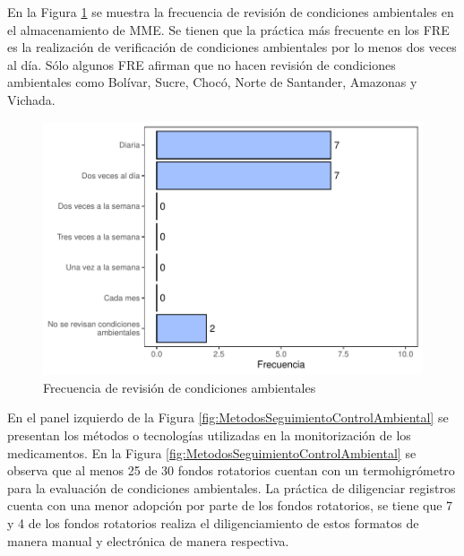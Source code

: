 \documentclass[
]{book}
\begin{document}
En la Figura \ref{fig:FrecRevCondiciones} se muestra la frecuencia de revisión de condiciones ambientales en el almacenamiento de MME. Se tienen que la práctica más frecuente en los FRE es la realización de verificación de condiciones ambientales por lo menos dos veces al día. Sólo algunos FRE afirman que no hacen revisión de condiciones ambientales como Bolívar, Sucre, Chocó, Norte de Santander, Amazonas y Vichada.

\begin{figure}
\includegraphics[width=0.85\linewidth]{InformeFinal_files/figure-latex/FrecRevCondiciones-1} \caption{Frecuencia de revisión de condiciones ambientales}\label{fig:FrecRevCondiciones}
\end{figure}

En el panel izquierdo de la Figura \ref{fig:MetodosSeguimientoControlAmbiental} se presentan los métodos o tecnologías utilizadas en la monitorización de los medicamentos. En la Figura \ref{fig:MetodosSeguimientoControlAmbiental} se observa que al menos 25 de 30 fondos rotatorios cuentan con un termohigrómetro para la evaluación de condiciones ambientales. La práctica de diligenciar registros cuenta con una menor adopción por parte de los fondos rotatorios, se tiene que 7 y 4 de los fondos rotatorios realiza el diligenciamiento de estos formatos de manera manual y electrónica de manera respectiva.
\end{document}
